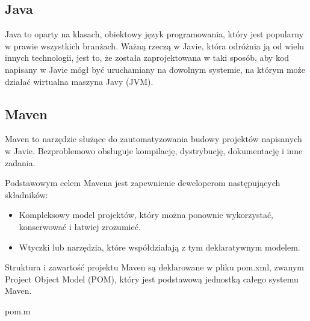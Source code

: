 \documentclass[10pt,a4paper]{report}
\begin{document}
\begin{adjustwidth}{2cm}{2cm}
\subsection{Java}
\begin{minipage}{1\linewidth}
Java to oparty na klasach, obiektowy  język programowania, który  jest popularny w prawie wszystkich branżach. 
Ważną rzeczą w Javie, która odróżnia ją od wielu innych technologii, jest to, że została zaprojektowana w taki sposób, aby kod napisany w Javie mógł być uruchamiany na dowolnym systemie, na którym może działać wirtualna maszyna Javy (JVM). 
\end{minipage}
\subsection{Maven}
\begin{minipage}{1\linewidth}
Maven to narzędzie służące do zautomatyzowania budowy projektów napisanych w Javie.
Bezproblemowo obsługuje kompilację, dystrybucję, dokumentację i inne zadania.
\end{minipage}
\begin{minipage}{1\linewidth}
Podstawowym celem Mavena jest zapewnienie deweloperom następujących składników:
\begin{itemize}
    \item Kompleksowy model projektów, który można ponownie wykorzystać, konserwować i łatwiej zrozumieć.
    \item Wtyczki lub narzędzia, które współdziałają z tym deklaratywnym modelem.
\end{itemize} 
Struktura i zawartość projektu Maven są deklarowane w pliku pom.xml, zwanym Project Object Model (POM), który jest podstawową jednostką całego systemu Maven.
\end{minipage}
\begin{center}
\begin{lstinputlisting}[ escapeinside=``,caption={\textit{Przykładowe użycie pliku pom.xml w projekcie}}]
{pom.m}
\end{lstinputlisting}
\end{center}

\end{adjustwidth}
\end{document}
